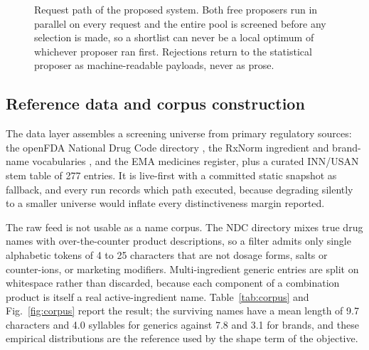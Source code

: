 \documentclass[conference]{IEEEtran}
\begin{document}
\begin{figure}[t]
{}
\caption{Request path of the proposed system. Both free proposers run in parallel
on every request and the entire pool is screened before any selection is made,
so a shortlist can never be a local optimum of whichever proposer ran first.
Rejections return to the statistical proposer as machine-readable payloads,
never as prose.}
\label{fig:arch}
\end{figure}

\subsection{Reference data and corpus construction}

The data layer assembles a screening universe from primary regulatory sources:
the openFDA National Drug Code directory \cite{openfda}, the RxNorm ingredient
and brand-name vocabularies \cite{rxnorm}, and the EMA medicines register, plus
a curated INN/USAN stem table of 277 entries. It is live-first with a committed
static snapshot as fallback, and every run records which path executed, because
degrading silently to a smaller universe would inflate every distinctiveness
margin reported.

The raw feed is not usable as a name corpus. The NDC directory mixes true drug
names with over-the-counter product descriptions, so a filter admits only single
alphabetic tokens of 4 to 25 characters that are not dosage forms, salts or
counter-ions, or marketing modifiers. Multi-ingredient generic entries are split
on whitespace rather than discarded, because each component of a combination
product is itself a real active-ingredient name. Table~\ref{tab:corpus} and
Fig.~\ref{fig:corpus} report the result; the surviving names have a mean length
of 9.7 characters and 4.0 syllables for generics against 7.8 and 3.1 for brands,
and these empirical distributions are the reference used by the shape term of the
objective.
\end{document}
